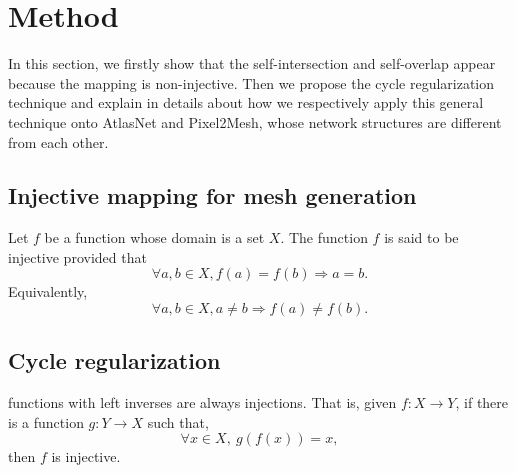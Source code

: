\section{Method}
In this section, we firstly show that the self-intersection and self-overlap appear because the mapping is non-injective. 
Then we propose the cycle regularization technique and explain in details about how we respectively apply this general technique onto AtlasNet\cite{atlasnet} and Pixel2Mesh\cite{pixel2mesh}, whose network structures are different from each other. 
\subsection{Injective mapping for mesh generation}
\label{subsec:inj}
\begin{m_def}
Let $f$ be a function whose domain is a set $X$. The function $f$ is said to be injective provided that
\begin{equation}
\forall a,b \in X, f(a) = f(b) \Rightarrow a = b.
\end{equation}
Equivalently, 
\begin{equation}
\forall a,b \in X, a \neq b \Rightarrow f(a) \neq f(b).
\end{equation}
\end{m_def}
\subsection{Cycle regularization}
\label{subsec:cylcereg}
\begin{m_thm}
functions with left inverses are always injections. That is, given $f:X \rightarrow Y$, if there is a function $g:Y \rightarrow X$ such that,
\begin{equation}
\forall x \in X,~g(f(x)) = x,
\end{equation}
then $f$ is injective.
\end{m_thm}
